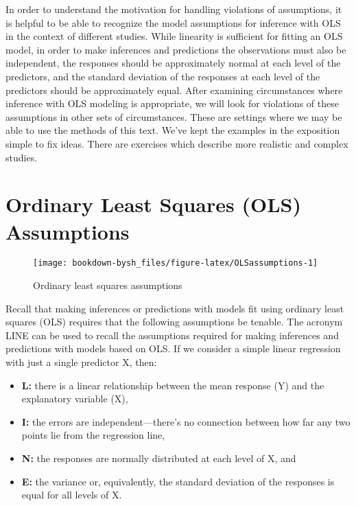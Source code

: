 \documentclass[
]{krantz}
\providecommand{\tightlist}{%
  \setlength{\itemsep}{0pt}\setlength{\parskip}{0pt}}
\begin{document}
In order to understand the motivation for handling violations of assumptions, it is helpful to be able to recognize the model assumptions for inference with OLS in the context of different studies. While linearity is sufficient for fitting an OLS model, in order to make inferences and predictions the observations must also be independent, the responses should be approximately normal at each level of the predictors, and the standard deviation of the responses at each level of the predictors should be approximately equal. After examining circumstances where inference with OLS modeling is appropriate, we will look for violations of these assumptions in other sets of circumstances. These are settings where we may be able to use the methods of this text. We've kept the examples in the exposition simple to fix ideas. There are exercises which describe more realistic and complex studies.

\hypertarget{ordinary-least-squares-ols-assumptions}{%
\section{Ordinary Least Squares (OLS) Assumptions}\label{ordinary-least-squares-ols-assumptions}}

\begin{figure}

{\centering \texttt{[image: bookdown-bysh\_files/figure-latex/OLSassumptions-1]} 

}

\caption{Ordinary least squares assumptions}\label{fig:OLSassumptions}
\end{figure}

Recall that making inferences or predictions with models fit using ordinary least squares (OLS) requires that the following assumptions be tenable. The acronym LINE can be used to recall the assumptions required for making inferences and predictions with models based on OLS. If we consider a simple linear regression with just a single predictor X, then:

\begin{itemize}
\tightlist
\item
  \textbf{L:} there is a linear relationship between the mean response (Y) and the explanatory variable (X),
\item
  \textbf{I:} the errors are independent---there's no connection between how far any two points lie from the regression line,
\item
  \textbf{N:} the responses are normally distributed at each level of X, and
\item
  \textbf{E:} the variance or, equivalently, the standard deviation of the responses is equal for all levels of X.
\end{itemize}
\end{document}

